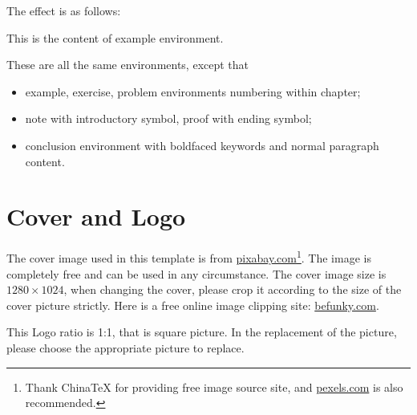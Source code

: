 \documentclass{elegantbook}
\begin{document}
The effect is as follows:

\begin{example}
This is the content of example environment.
\end{example}

These are all the same environments, except that

\begin{itemize}
   \item example, exercise, problem environments numbering within chapter;
   \item note with introductory symbol, proof with ending symbol;
   \item conclusion environment with boldfaced keywords and normal paragraph content.
\end{itemize}


\section{Cover and Logo}

The cover image used in this template is from \href{https://pixabay.com/en/tea-time-poetry-coffee-reading-3240766/}{pixabay.com}\footnote{Thank China\TeX{} for providing free image source site, and \href{https://www.pexels.com/}{pexels.com} is also recommended.}. The image is completely free and can be used in any circumstance. The cover image size is $1280 \times 1024$, when changing the cover, please crop it according to the size of the cover picture strictly. Here is a free online image clipping site: \href{https://www.befunky.com/create/crop-photo/}{befunky.com}.

This Logo ratio is 1:1, that is square picture. In the replacement of the picture, please choose the appropriate picture to replace.
\end{document}
